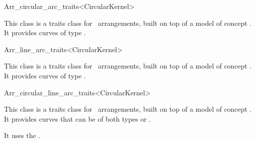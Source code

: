 \begin{ccRefClass}{Arr_circular_arc_traits<CircularKernel>}


\ccDefinition

This class is a traits class for \cgal\ arrangements, built on top of a model of 
concept .
It provides curves of type .

\ccIsModel
{}

\end{ccRefClass}
\begin{ccRefClass}{Arr_line_arc_traits<CircularKernel>}


\ccDefinition

This class is a traits class for \cgal\ arrangements, built on top of a
model of concept .  It provides curves of type
.

\ccIsModel
{}

\end{ccRefClass}
\begin{ccRefClass}{Arr_circular_line_arc_traits<CircularKernel>}


\ccDefinition

This class is a traits class for \cgal\ arrangements, built on top of a
model of concept . It provides curves that can be
of both types
 or 
.

It uses the . 

\ccIsModel
{}

\end{ccRefClass}
